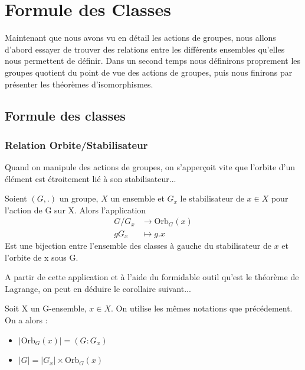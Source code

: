 \chapter{Formule des Classes}

\setlength{\parindent}{0pt}
\renewcommand{\labelitemi}{\textbullet} %


Maintenant que nous avons vu en détail les actions de groupes, nous allons d'abord essayer de trouver des relations entre les différents ensembles qu'elles 
nous permettent de définir. 
Dans un second temps nous définirons proprement les groupes quotient du point de vue des actions de groupes, puis 
nous finirons par présenter les théorèmes d'isomorphismes. 


\section{Formule des classes}
\subsection{Relation Orbite/Stabilisateur}

Quand on manipule des actions de groupes, on s'apperçoit vite que l'orbite d'un élément 
est étroitement lié à son stabilisateur... 

\begin{proposition}
	Soient $(G,.)$ un groupe, $X$ un ensemble et $G_x$ le stabilisateur de $x \in X$ pour l'action de G sur X. 
	Alors l'application 
		\begin{align*}
			G/G_x &\longrightarrow \text{Orb}_G(x) \\
			g G_x &\longmapsto g.x 
		\end{align*}
	Est une bijection entre l'ensemble des classes à gauche du stabilisateur de $x$ et l'orbite de x sous G. 
\end{proposition}

A partir de cette application et à l'aide du formidable outil qu'est le théorème de Lagrange, on peut en déduire le corollaire suivant... 

\begin{corollary}
	Soit X un  G-ensemble, $x \in X$. On utilise les mêmes notations que précédement. On a alors :
	\begin{itemize}
		\item $ | \text{Orb}_G(x) | = (G : G_x) $
		\item $ |G| = |G_x| \times \text{Orb}_G(x) $ 
	\end{itemize}
\end{corollary}

